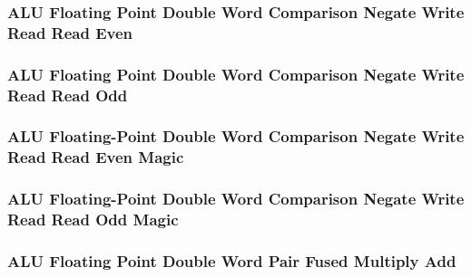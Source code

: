 

\subsubsection[{\small ALU Floating Point Double Word Comparison Negate Write Read Read Even}]{ALU Floating Point Double Word Comparison Negate Write Read Read Even} \label{sec:format-ALU-FDCNWRRE}



\subsubsection[{\small ALU Floating Point Double Word Comparison Negate Write Read Read Odd}]{ALU Floating Point Double Word Comparison Negate Write Read Read Odd} \label{sec:format-ALU-FDCNWRRO}



\subsubsection[{\small ALU Floating-Point Double Word Comparison Negate Write Read Read Even Magic}]{ALU Floating-Point Double Word Comparison Negate Write Read Read Even Magic} \label{sec:format-ALU-FDCNWRRE.M}



\subsubsection[{\small ALU Floating-Point Double Word Comparison Negate Write Read Read Odd Magic}]{ALU Floating-Point Double Word Comparison Negate Write Read Read Odd Magic} \label{sec:format-ALU-FDCNWRRO.M}



\subsubsection[{\small ALU Floating Point Double Word Pair Fused Multiply Add}]{ALU Floating Point Double Word Pair Fused Multiply Add} \label{sec:format-ALU-FDPFMA}

